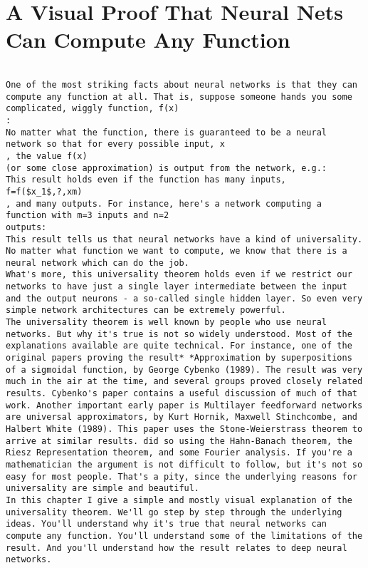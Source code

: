 
\chapter{A Visual Proof That Neural Nets Can Compute Any Function}
\label{sec:AVisualProofThatNeuralNetsCanComputeAnyFunction}


\begin{lstlisting}

One of the most striking facts about neural networks is that they can compute any function at all. That is, suppose someone hands you some complicated, wiggly function, f(x)
:
No matter what the function, there is guaranteed to be a neural network so that for every possible input, x
, the value f(x)
(or some close approximation) is output from the network, e.g.:
This result holds even if the function has many inputs, f=f($x_1$,?,xm)
, and many outputs. For instance, here's a network computing a function with m=3 inputs and n=2
outputs:
This result tells us that neural networks have a kind of universality. No matter what function we want to compute, we know that there is a neural network which can do the job.
What's more, this universality theorem holds even if we restrict our networks to have just a single layer intermediate between the input and the output neurons - a so-called single hidden layer. So even very simple network architectures can be extremely powerful.
The universality theorem is well known by people who use neural networks. But why it's true is not so widely understood. Most of the explanations available are quite technical. For instance, one of the original papers proving the result* *Approximation by superpositions of a sigmoidal function, by George Cybenko (1989). The result was very much in the air at the time, and several groups proved closely related results. Cybenko's paper contains a useful discussion of much of that work. Another important early paper is Multilayer feedforward networks are universal approximators, by Kurt Hornik, Maxwell Stinchcombe, and Halbert White (1989). This paper uses the Stone-Weierstrass theorem to arrive at similar results. did so using the Hahn-Banach theorem, the Riesz Representation theorem, and some Fourier analysis. If you're a mathematician the argument is not difficult to follow, but it's not so easy for most people. That's a pity, since the underlying reasons for universality are simple and beautiful.
In this chapter I give a simple and mostly visual explanation of the universality theorem. We'll go step by step through the underlying ideas. You'll understand why it's true that neural networks can compute any function. You'll understand some of the limitations of the result. And you'll understand how the result relates to deep neural networks.

\end{lstlisting}
